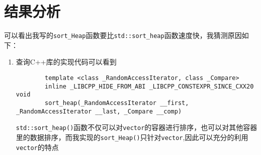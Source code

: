 \documentclass[UTF8]{ctexart}
\begin{document}
\section{结果分析}
可以看出我写的\texttt{sort\_Heap}函数要比\texttt{std::sort\_heap}函数速度快，我猜测原因如下：
\begin{enumerate}
	\item 
	查询C++库的实现代码可以看到
	\begin{lstlisting}
		template <class _RandomAccessIterator, class _Compare>
		inline _LIBCPP_HIDE_FROM_ABI _LIBCPP_CONSTEXPR_SINCE_CXX20 void
		sort_heap(_RandomAccessIterator __first, _RandomAccessIterator __last, _Compare __comp)
	\end{lstlisting}
	\texttt{std::sort\_heap()}函数不仅可以对\texttt{vector}的容器进行排序，也可以对其他容器里的数据排序，而我实现的\texttt{sort\_Heap()}只针对\texttt{vector},因此可以充分的利用\texttt{vector}的特点
\end{enumerate}
\end{document}
